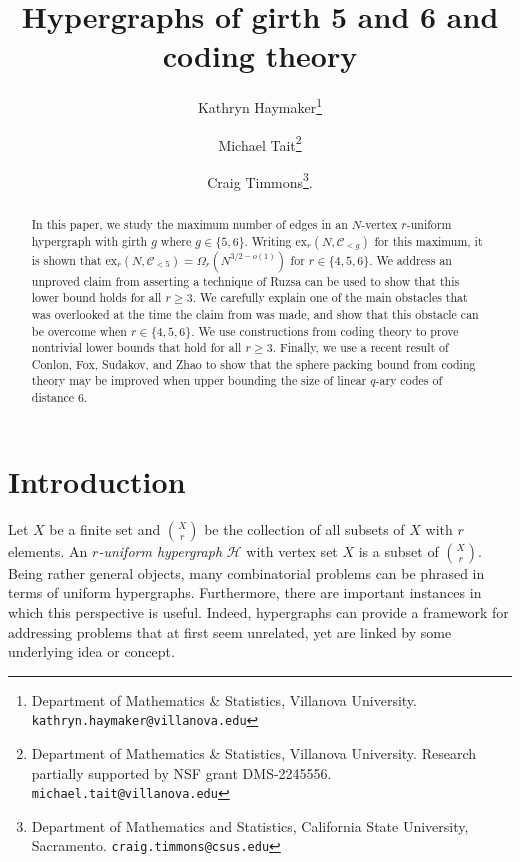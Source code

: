 \documentclass[12pt]{article}%
\title{Hypergraphs of girth 5 and 6 and coding theory}
\author{Kathryn Haymaker\thanks{Department of Mathematics \& Statistics, Villanova University. \texttt{kathryn.haymaker@villanova.edu}} \and Michael Tait\thanks{Department of Mathematics \& Statistics, Villanova University. Research partially supported by NSF grant DMS-2245556. \texttt{michael.tait@villanova.edu}} \and Craig Timmons\thanks{Department of Mathematics and Statistics, California State University, Sacramento. \texttt{craig.timmons@csus.edu}}.
}
\begin{document}
\maketitle

\begin{abstract}
    In this paper, we study the maximum number of edges in an $N$-vertex $r$-uniform hypergraph with girth $g$ where $g \in \{5,6 \}$.  Writing 
$\textrm{ex}_r ( N, \mathcal{C}_{<g} )$ for this maximum, 
it is shown that $\textrm{ex}_r ( N , \mathcal{C}_{ < 5} ) = \Omega_r ( N^{3/2 - o(1)} )$ for $r \in \{4,5,6 \}$.  We address an unproved claim from \cite{TV} asserting a technique of Ruzsa can be used to show that this 
lower bound holds for all $r \geq 3$.  We carefully explain one of the main obstacles that was overlooked at the time the claim from \cite{TV} was made, and 
show that this obstacle can be overcome when $r\in \{4,5,6\}$.  We use constructions from coding theory to prove 
nontrivial lower bounds that hold for all $r \geq 3$. Finally, we use a recent result of Conlon, Fox, Sudakov, and Zhao to show that the sphere packing bound from coding theory may be improved when upper bounding the size of linear $q$-ary codes of distance $6$.
\end{abstract}
 



\section{Introduction}

Let $X$ be a finite set and $\binom{X}{r}$ be the collection of all subsets of $X$ with $r$ elements.
An \emph{$r$-uniform hypergraph} $\mathcal{H}$ with vertex set $X$ is a subset of $\binom{X}{r}$.  
Being rather general objects, many combinatorial problems can be phrased in terms of uniform hypergraphs.
Furthermore, there are important instances in which this perspective is useful.  Indeed, hypergraphs can provide a framework for addressing problems that at first seem unrelated, yet are linked by some underlying idea or concept.      
\end{document}
